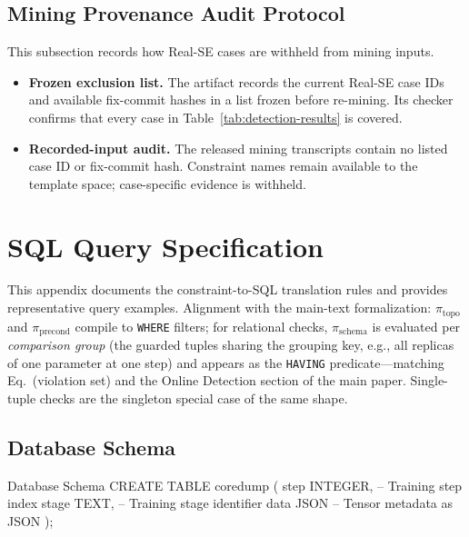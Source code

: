 \documentclass[sigconf,nonacm]{acmart}
\begin{document}
\subsection{Mining Provenance Audit Protocol}
\label{app:provenance}

This subsection records how Real-SE cases are withheld from mining inputs.

\begin{itemize}[leftmargin=*]
\item \textbf{Frozen exclusion list.} The artifact records the current
Real-SE case IDs and available fix-commit hashes in a list frozen before
re-mining. Its checker confirms that every case in
Table~\ref{tab:detection-results} is covered.
\item \textbf{Recorded-input audit.} The released mining transcripts contain
no listed case ID or fix-commit hash. Constraint names remain available to the
template space; case-specific evidence is withheld.
\end{itemize}

\section{SQL Query Specification}
\label{app:sql}

This appendix documents the constraint-to-SQL translation rules and provides representative query examples. Alignment with the main-text formalization: $\pi_{\text{topo}}$ and $\pi_{\text{precond}}$ compile to \texttt{WHERE} filters; for relational checks, $\pi_{\text{schema}}$ is evaluated per \emph{comparison group} (the guarded tuples sharing the grouping key, e.g., all replicas of one parameter at one step) and appears as the \texttt{HAVING} predicate---matching Eq.~(violation set) and the Online Detection section of the main paper. Single-tuple checks are the singleton special case of the same shape.

\subsection{Database Schema}

\begin{sqlcode}{Database Schema}
CREATE TABLE coredump (
    step    INTEGER,    -- Training step index
    stage   TEXT,       -- Training stage identifier
    data    JSON        -- Tensor metadata as JSON
);
\end{sqlcode}
\end{document}
